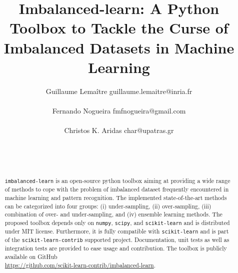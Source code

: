 \documentclass[twoside,11pt]{article}
\begin{document}
\title{Imbalanced-learn: A Python Toolbox to Tackle the Curse of Imbalanced Datasets in Machine Learning}
\author{Guillaume Lema\^itre \email guillaume.lemaitre@inria.fr \\
   \\
  \AND
  Fernando Nogueira \email fmfnogueira@gmail.com \\
   \\
  \AND
  Christos K. Aridas \email char@upatras.gr \\ 
   \\
   \\ 
   \\ 
  } 

\maketitle

\begin{abstract}%
  \texttt{imbalanced-learn} is an open-source python toolbox aiming at providing a wide range of methods to cope with the problem of imbalanced dataset frequently encountered in machine learning and pattern recognition.
  The implemented state-of-the-art methods can be categorized into four groups: (i) under-sampling, (ii) over-sampling, (iii) combination of over- and under-sampling, and (iv) ensemble learning methods.
  The proposed toolbox depends only on \texttt{numpy}, \texttt{scipy}, and \texttt{scikit-learn} and is distributed under MIT license.
  Furthermore, it is fully compatible with \texttt{scikit-learn} and is part of the \texttt{scikit-learn-contrib} supported project.
  Documentation, unit tests as well as integration tests are provided to ease usage and contribution.
  The toolbox is publicly available on GitHub \\ \url{https://github.com/scikit-learn-contrib/imbalanced-learn}.
\end{abstract}
\end{document}

